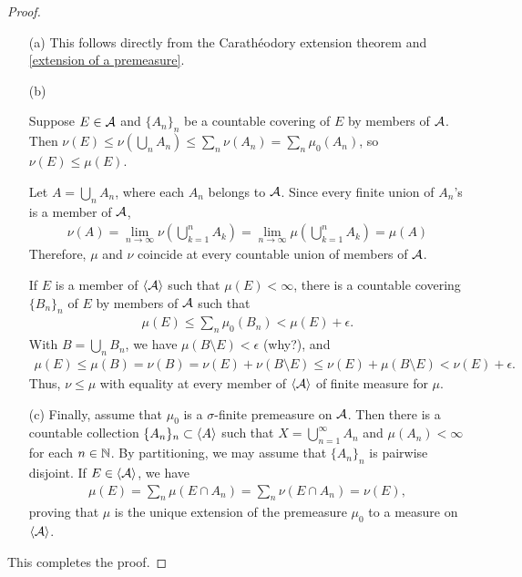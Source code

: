\begin{proof}
    \begin{enumerate}
        \item[(a)]
        {
            This follows directly from the Carath\'eodory extension theorem and \cref{extension of a premeasure}.
        }
        \item[(b)]
        {
            Suppose $E\in{{\mathcal{A}}}$ and $\{A_n\}_n$ be a countable covering of $E$ by members of ${\mathcal{A}}$.
            Then $\nu(E)\leq\nu\left(\bigcup_n A_n\right)\leq\sum_n\nu(A_n)=\sum_n\mu_0(A_n)$, so $\nu(E)\leq\mu(E)$.

            Let $A=\bigcup_n A_n$, where each $A_n$ belongs to ${\mathcal{A}}$.
            Since every finite union of $A_n$'s is a member of ${\mathcal{A}}$,
            \begin{align*}
                \nu(A)=\lim_{n\rightarrow\infty}\nu\left(\bigcup_{k=1}^n A_k\right)=\lim_{n\rightarrow\infty}\mu\left(\bigcup_{k=1}^n A_k\right)=\mu(A)
            \end{align*}
            Therefore, $\mu$ and $\nu$ coincide at every countable union of members of ${\mathcal{A}}$.
            
            If $E$ is a member of ${\left\langle{{\mathcal{A}}}\right\rangle}$ such that $\mu(E)<\infty$, there is a countable covering $\{B_n\}_n$ of $E$ by members of ${\mathcal{A}}$ such that
            \begin{align*}
                \mu(E)\leq\sum_n\mu_0(B_n)<\mu(E)+\epsilon.
            \end{align*}
            With $B=\bigcup_n B_n$, we have $\mu(B\setminus E)<\epsilon$ \color{brown}(why?)\color{black}, and
            \begin{align*}
                \mu(E)\leq\mu(B)=\nu(B)=\nu(E)+\nu(B\setminus E)\leq\nu(E)+\mu(B\setminus E)<\nu(E)+\epsilon.
            \end{align*}
            Thus, $\nu\leq\mu$ with equality at every member of ${\left\langle{{\mathcal{A}}}\right\rangle}$ of finite measure for $\mu$.
        }
        \item[(c)]
        {
            Finally, assume that $\mu_0$ is a $\sigma$-finite premeasure on ${\mathcal{A}}$.
            Then there is a countable collection $\{A_n\}_n\subset{\left\langle{A}\right\rangle}$ such that $X=\bigcup_{n=1}^\infty A_n$ and $\mu(A_n)<\infty$ for each $n\in{\mathbb{N}}$.
            By partitioning, we may assume that $\{A_n\}_n$ is pairwise disjoint.
            If $E\in{\left\langle{{\mathcal{A}}}\right\rangle}$, we have
            \begin{align*}
                \mu(E)=\sum_n\mu(E\cap A_n)=\sum_n\nu(E\cap A_n)=\nu(E),
            \end{align*}
            proving that $\mu$ is the unique extension of the premeasure $\mu_0$ to a measure on ${\left\langle{{\mathcal{A}}}\right\rangle}$.
        }
    \end{enumerate}
    This completes the proof.
\end{proof}

